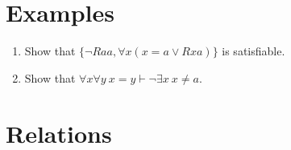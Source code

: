 \documentclass[a4paper, 11pt]{article} %
\newcommand{\set}[1]{\lbrace#1\rbrace} %
\newcommand{\qt}[2]{#1 #2} %
\begin{document}
\section*{Examples}

\begin{enumerate}
\item Show that $\set{{\neg}Raa, \qt{\forall}{x} (x{=}a \vee Rxa)}$ is satisfiable. 
\item Show that $\qt{\forall}{x}\qt{\forall}{y}\ x{=}y \vdash \neg \qt{\exists}{x}\ x \neq a$.
\end{enumerate}






\section*{Relations}
\end{document}
